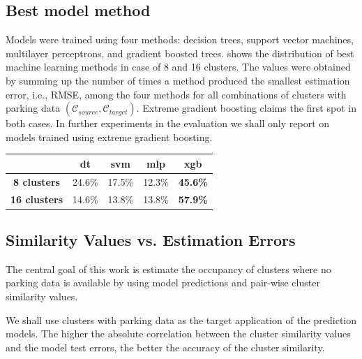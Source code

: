\documentclass{ws-ijait}
\begin{document}
		\subsection{Best model method}
		Models were trained using four methods: decision trees, support vector machines, multilayer perceptrons, and gradient boosted trees.  shows the distribution of best machine learning methods in case of 8 and 16 clusters.
		The values were obtained by summing up the number of times a method produced the smallest estimation error, i.e., RMSE, among the four methods for all combinations of clusters with parking data $(\mathcal{C}_{source}, \mathcal{C}_{target})$.
		Extreme gradient boosting claims the first spot in both cases.
		In further experiments in the evaluation we shall only report on models trained using extreme gradient boosting.
		
		\begin{table}[!ht]
			{\begin{tabular}{ | c | c | c | c | c |}
					\hline
					& \textbf{dt} & \textbf{svm} & \textbf{mlp} & \textbf{xgb} \\ \hline
					\textbf{8 clusters} & 24.6\% & 17.5\% & 12.3\% & \textbf{45.6\%} \\ \hline
					\textbf{16 clusters} & 14.6\% & 13.8\% & 13.8\% & \textbf{57.9\%} \\ \hline
				\end{tabular}}
				\label{evaluation:best_model_method}
		\end{table}
			
		\subsection{Similarity Values vs. Estimation Errors}
		The central goal of this work is estimate the occupancy of clusters where no parking data is available by using model predictions and pair-wise cluster similarity values. 
		
		
		We shall use clusters with parking data as the target application of the prediction models. 
		The higher the absolute correlation between the cluster similarity values and the model test errors, the better the accuracy of the cluster similarity. 
		
\end{document}
